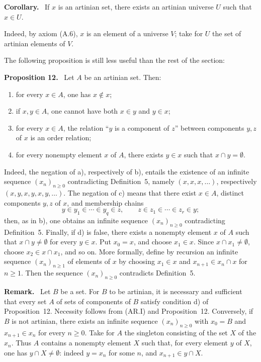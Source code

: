 \documentclass[11pt]{article}
\newenvironment{statement}[1]{\par\medskip\noindent\textbf{#1.}\ }{\par\medskip}
\newenvironment{remarktext}[1]{\par\medskip\noindent\textbf{#1.}\ }{\par\medskip}
\begin{document}
\begin{statement}{Corollary}
If \(x\) is an artinian set, there exists an artinian universe \(U\) such that \(x\in U\).
\end{statement}
Indeed, by axiom (A.6), \(x\) is an element of a universe \(V\); take for \(U\) the set of artinian elements of \(V\).

The following proposition is still less useful than the rest of the section:

\begin{statement}{Proposition 12}
Let \(A\) be an artinian set. Then:
\begin{enumerate}[label=\alph*)]
\item for every \(x\in A\), one has \(x\notin x\);
\item if \(x,y\in A\), one cannot have both \(x\in y\) and \(y\in x\);
\item for every \(x\in A\), the relation ``\(y\) is a component of \(z\)'' between components \(y,z\) of \(x\) is an order relation;
\item for every nonempty element \(x\) of \(A\), there exists \(y\in x\) such that \(x\cap y=\emptyset\).
\end{enumerate}
\end{statement}
Indeed, the negation of a), respectively of b), entails the existence of an infinite sequence \((x_n)_{n\geq0}\) contradicting Definition~5, namely \((x,x,x,\ldots)\), respectively \((x,y,x,y,x,y,\ldots)\). The negation of c) means that there exist \(x\in A\), distinct components \(y,z\) of \(x\), and membership chains
\[
 y\in y_1\in\cdots\in y_q\in z,
 \qquad
 z\in z_1\in\cdots\in z_r\in y;
\]
then, as in b), one obtains an infinite sequence \((x_n)_{n\geq0}\) contradicting Definition~5. Finally, if d) is false, there exists a nonempty element \(x\) of \(A\) such that \(x\cap y\neq\emptyset\) for every \(y\in x\). Put \(x_0=x\), and choose \(x_1\in x\). Since \(x\cap x_1\neq\emptyset\), choose \(x_2\in x\cap x_1\), and so on. More formally, define by recursion an infinite sequence \((x_n)_{n\geq1}\) of elements of \(x\) by choosing \(x_1\in x\) and \(x_{n+1}\in x_n\cap x\) for \(n\geq1\). Then the sequence \((x_n)_{n\geq0}\) contradicts Definition~5.

\begin{remarktext}{Remark}
Let \(B\) be a set. For \(B\) to be artinian, it is necessary and sufficient that every set \(A\) of sets of components of \(B\) satisfy condition d) of Proposition~12. Necessity follows from (AR.I) and Proposition~12. Conversely, if \(B\) is not artinian, there exists an infinite sequence \((x_n)_{n\geq0}\) with \(x_0=B\) and \(x_{n+1}\in x_n\) for every \(n\geq0\). Take for \(A\) the singleton consisting of the set \(X\) of the \(x_n\). Thus \(A\) contains a nonempty element \(X\) such that, for every element \(y\) of \(X\), one has \(y\cap X\neq\emptyset\): indeed \(y=x_n\) for some \(n\), and \(x_{n+1}\in y\cap X\).
\end{remarktext}
\end{document}
